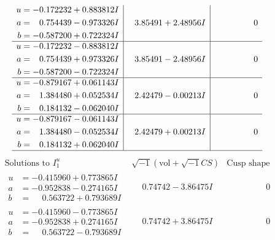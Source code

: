 \documentclass[1p]{elsarticle_modified}
\theoremstyle{definition}
\newcommand{\I}{\sqrt{-1}}
\begin{document}
$$\begin{array}{c|c|c}
\begin{aligned}
u &= -0.172232 + 0.883812 I \\
a &= \phantom{-}0.754439 - 0.973326 I \\
b &= -0.587200 + 0.722324 I\end{aligned}
 & \phantom{-}3.85491 + 2.48956 I & \phantom{-0.000000 } 0 \\ \hline\begin{aligned}
u &= -0.172232 - 0.883812 I \\
a &= \phantom{-}0.754439 + 0.973326 I \\
b &= -0.587200 - 0.722324 I\end{aligned}
 & \phantom{-}3.85491 - 2.48956 I & \phantom{-0.000000 } 0 \\ \hline\begin{aligned}
u &= -0.879167 + 0.061143 I \\
a &= \phantom{-}1.384480 + 0.052534 I \\
b &= \phantom{-}0.184132 - 0.062040 I\end{aligned}
 & \phantom{-}2.42479 - 0.00213 I & \phantom{-0.000000 } 0 \\ \hline\begin{aligned}
u &= -0.879167 - 0.061143 I \\
a &= \phantom{-}1.384480 - 0.052534 I \\
b &= \phantom{-}0.184132 + 0.062040 I\end{aligned}
 & \phantom{-}2.42479 + 0.00213 I & \phantom{-0.000000 } 0\\
 \hline 
 \end{array}$$\newpage$$\begin{array}{c|c|c}  
\text{Solutions to }I^u_{1}& \I (\text{vol} + \sqrt{-1}CS) & \text{Cusp shape}\\
 \hline 
\begin{aligned}
u &= -0.415960 + 0.773865 I \\
a &= -0.952838 - 0.274165 I \\
b &= \phantom{-}0.563722 + 0.793689 I\end{aligned}
 & \phantom{-}0.74742 - 3.86475 I & \phantom{-0.000000 } 0 \\ \hline\begin{aligned}
u &= -0.415960 - 0.773865 I \\
a &= -0.952838 + 0.274165 I \\
b &= \phantom{-}0.563722 - 0.793689 I\end{aligned}
 & \phantom{-}0.74742 + 3.86475 I & \phantom{-0.000000 } 0 \\ \hline\begin{aligned}

\end{aligned}
\end{array}$$
\end{document}
